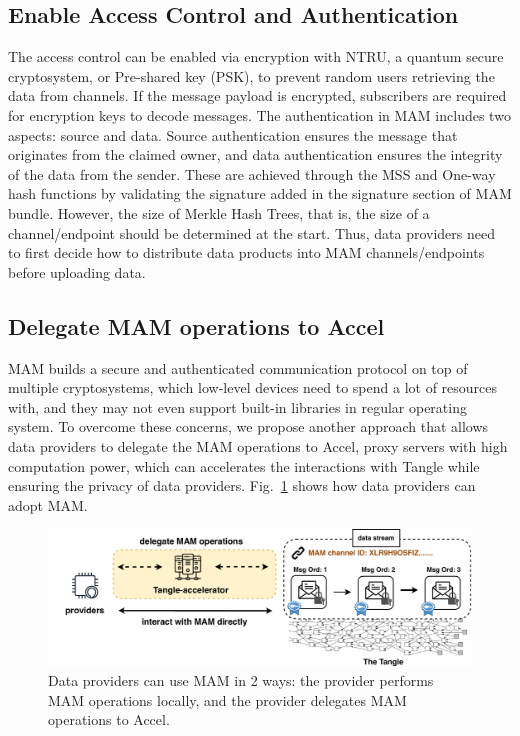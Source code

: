 \documentclass[conference]{IEEEtran}
\begin{document}
\subsection{Enable Access Control and Authentication}
\label{section:mam_features}
The access control can be enabled via encryption with NTRU\cite{NTRU}, a quantum secure cryptosystem, or Pre-shared key (PSK), to prevent random users retrieving the data from channels. If the message payload is encrypted, subscribers are required for encryption keys to decode messages. The authentication in MAM includes two aspects: source and data. Source authentication ensures the message that originates from the claimed owner, and data authentication ensures the integrity of the data from the sender. These are achieved through the MSS and One-way hash functions by validating the signature added in the signature section of MAM bundle. However, the size of Merkle Hash Trees, that is, the size of a channel/endpoint should be determined at the start. Thus, data providers need to first decide how to distribute data products into MAM channels/endpoints before uploading data. 

\subsection{Delegate MAM operations to Accel}
\label{section:ta_endpoint}
MAM builds a secure and authenticated communication protocol on top of multiple cryptosystems, which low-level devices need to spend a lot of resources with, and they may not even support built-in libraries in regular operating system. To overcome these concerns, we propose another approach that allows data providers to delegate the MAM operations to Accel, proxy servers with high computation power, which can accelerates the interactions with Tangle while ensuring the privacy of data providers. Fig.~\ref{fig:delegation} shows how data providers can adopt MAM.

\begin{figure}[!t]
    \centering
    \includegraphics[width=\linewidth]{delegation}
    \caption{Data providers can use MAM in 2 ways: the provider performs MAM operations locally, and the provider delegates MAM operations to Accel.}
    \label{fig:delegation}
\end{figure}
\end{document}
